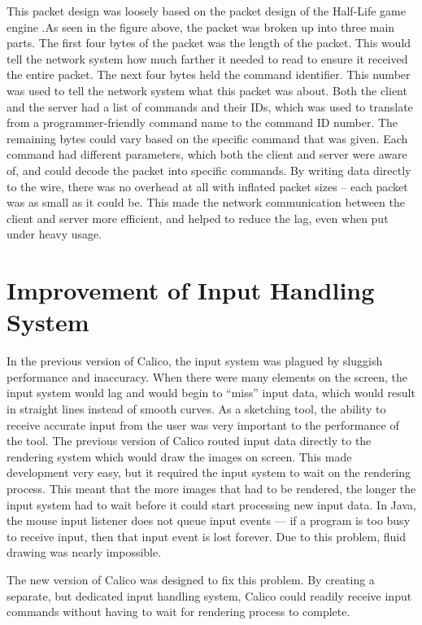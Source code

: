 This packet design was loosely based on the packet design of the Half-Life game engine \cite{rcon}.As seen in the figure above, the packet was broken up into three main parts. The first four bytes of the packet was the length of the packet. This would tell the network system how much farther it needed to read to ensure it received the entire packet. The next four bytes held the command identifier. This number was used to tell the network system what this packet was about. Both the client and the server had a list of commands and their IDs, which was used to translate from a programmer-friendly command name to the command ID number. The remaining bytes could vary based on the specific command that was given. Each command had different parameters, which both the client and server were aware of, and could decode the packet into specific commands. By writing data directly to the wire, there was no overhead at all with inflated packet sizes -- each packet was as small as it could be. This made the network communication between the client and server more efficient, and helped to reduce the lag, even when put under heavy usage.

\section{Improvement of Input Handling System}
In the previous version of Calico, the input system was plagued by sluggish performance and inaccuracy. When there were many elements on the screen, the input system would lag and would begin to ``miss'' input data, which would result in straight lines instead of smooth curves. As a sketching tool, the ability to receive accurate input from the user was very important to the performance of the tool. The previous version of Calico routed input data directly to the rendering system which would draw the images on screen. This made development very easy, but it required the input system to wait on the rendering process. This meant that the more images that had to be rendered, the longer the input system had to wait before it could start processing new input data. In Java, the mouse input listener does not queue input events --- if a program is too busy to receive input, then that input event is lost forever. Due to this problem, fluid drawing was nearly impossible.   

The new version of Calico was designed to fix this problem. By creating a separate, but dedicated input handling system, Calico could readily receive input commands without having to wait for rendering process to complete.

